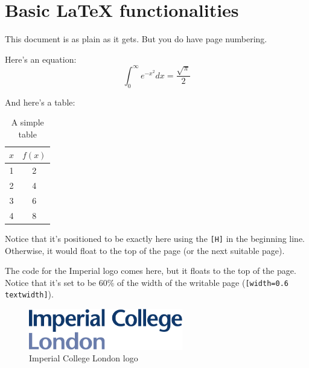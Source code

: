 \documentclass[12pt,twoside]{article}
\begin{document}




\section*{Basic LaTeX functionalities}

This document is as plain as it gets. But you do have page numbering.

Here's an equation:
\begin{equation}
    \int_{0}^{\infty} e^{-x^2} dx = \frac{\sqrt{\pi}}{2}
    \label{eq:gaussian_integral}
\end{equation}

And here's a table:
\begin{table}[H]
    \centering
    \begin{tabular}{c|c}
        $x$ & $f(x)$ \\
        \hline
        1 & 2 \\
        2 & 4 \\
        3 & 6 \\
        4 & 8 \\
    \end{tabular}
    \caption{A simple table}
    \label{tab:simple_table}
\end{table}
Notice that it's positioned to be exactly here using the \texttt{[H]} in the
beginning line. Otherwise, it would float to the top of the page (or the next
suitable page).

The code for the Imperial logo comes here, but it floats to the top of the page.
Notice that it's set to be 60\% of the width of the writable page 
(\texttt{[width=0.6 textwidth]}).
\begin{figure}
    \centering
    \includegraphics[width=0.6\textwidth]{./figures/imperial.pdf}
    \caption{Imperial College London logo}
    \label{fig:imperial_logo}
\end{figure}
\end{document}
